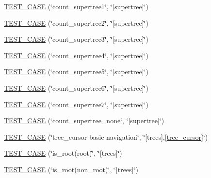 \begin{DoxyCompactItemize}
\hyperlink{namespaceterraces_1_1tests_a74e1768d2010ba771df04a9f6a1493f8}{T\+E\+S\+T\+\_\+\+C\+A\+SE} (\char`\"{}count\+\_\+supertree1\char`\"{}, \char`\"{}\mbox{[}supertree\mbox{]}\char`\"{})
\item 
\hyperlink{namespaceterraces_1_1tests_a060b8a146999829c4af97692264d260d}{T\+E\+S\+T\+\_\+\+C\+A\+SE} (\char`\"{}count\+\_\+supertree2\char`\"{}, \char`\"{}\mbox{[}supertree\mbox{]}\char`\"{})
\item 
\hyperlink{namespaceterraces_1_1tests_a2794f717efb013e5d7f8a084b3192c2c}{T\+E\+S\+T\+\_\+\+C\+A\+SE} (\char`\"{}count\+\_\+supertree3\char`\"{}, \char`\"{}\mbox{[}supertree\mbox{]}\char`\"{})
\item 
\hyperlink{namespaceterraces_1_1tests_ae2254265c9a29c1103697d80a885a0e6}{T\+E\+S\+T\+\_\+\+C\+A\+SE} (\char`\"{}count\+\_\+supertree4\char`\"{}, \char`\"{}\mbox{[}supertree\mbox{]}\char`\"{})
\item 
\hyperlink{namespaceterraces_1_1tests_a8a44b88bdcfe5d16def0c5aa0c5bae5d}{T\+E\+S\+T\+\_\+\+C\+A\+SE} (\char`\"{}count\+\_\+supertree5\char`\"{}, \char`\"{}\mbox{[}supertree\mbox{]}\char`\"{})
\item 
\hyperlink{namespaceterraces_1_1tests_a500bea3323b46d3aee9dfc5f705a1c7b}{T\+E\+S\+T\+\_\+\+C\+A\+SE} (\char`\"{}count\+\_\+supertree6\char`\"{}, \char`\"{}\mbox{[}supertree\mbox{]}\char`\"{})
\item 
\hyperlink{namespaceterraces_1_1tests_ad156ba4021b3161f1379bcc7ee1d22f1}{T\+E\+S\+T\+\_\+\+C\+A\+SE} (\char`\"{}count\+\_\+supertree7\char`\"{}, \char`\"{}\mbox{[}supertree\mbox{]}\char`\"{})
\item 
\hyperlink{namespaceterraces_1_1tests_ada2e4bbb10e908a4ed9ce7c34a54a962}{T\+E\+S\+T\+\_\+\+C\+A\+SE} (\char`\"{}count\+\_\+supertree\+\_\+none\char`\"{}, \char`\"{}\mbox{[}supertree\mbox{]}\char`\"{})
\item 
\hyperlink{namespaceterraces_1_1tests_a8684a15b92192ef734d91af9ab6d04a2}{T\+E\+S\+T\+\_\+\+C\+A\+SE} (\char`\"{}tree\+\_\+cursor basic navigation\char`\"{}, \char`\"{}\mbox{[}trees\mbox{]},\mbox{[}\hyperlink{classterraces_1_1tree__cursor}{tree\+\_\+cursor}\mbox{]}\char`\"{})
\item 
\hyperlink{namespaceterraces_1_1tests_a20f9db48a84175d0607cdb5176471941}{T\+E\+S\+T\+\_\+\+C\+A\+SE} (\char`\"{}is\+\_\+root(root)\char`\"{}, \char`\"{}\mbox{[}trees\mbox{]}\char`\"{})
\item 
\hyperlink{namespaceterraces_1_1tests_a671769bc09367ff84b390217d22d13f1}{T\+E\+S\+T\+\_\+\+C\+A\+SE} (\char`\"{}is\+\_\+root(non\+\_\+root)\char`\"{}, \char`\"{}\mbox{[}trees\mbox{]}\char`\"{})

\end{DoxyCompactItemize}
